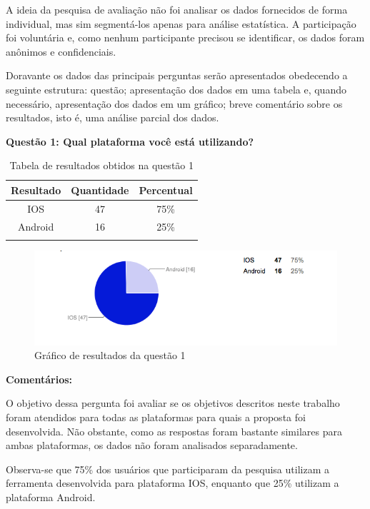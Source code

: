A ideia da pesquisa de avaliação não foi analisar os dados fornecidos de forma individual, mas sim segmentá-los apenas para análise estatística. A participação foi voluntária e, como nenhum participante precisou se identificar, os dados foram anônimos e confidenciais.    

Doravante os dados das principais perguntas serão apresentados obedecendo a seguinte estrutura: questão; apresentação dos dados em uma tabela e, quando necessário, apresentação dos dados em um gráfico; breve comentário sobre os resultados, isto é, uma análise parcial dos dados.

\textbf{Questão 1:  Qual plataforma você está utilizando?}

\begin{center}
\begin{longtable}{c|c|c}
\hline
    \multicolumn{1}{c}{\textbf{Resultado}} & \multicolumn{1}{c}{\textbf{Quantidade}} & \multicolumn{1}{c}{\textbf{Percentual}} \\
\hline
    IOS & 47 &  75\%\\
    \hline
    Android & 16 & 25\%\\
    \hline
\caption{Tabela de resultados obtidos na questão 1}
\end{longtable}
\end{center}


\begin{figure}[h]
\begin{center}
  \includegraphics[width=12cm]{images/graficos/questao1.png}
  \caption{Gráfico de resultados da questão 1}
  \label{fig:questao1}
\end{center}
\end{figure}

\textbf{Comentários:}

O objetivo dessa pergunta foi avaliar se os objetivos descritos neste trabalho foram atendidos para todas as plataformas para quais a proposta foi desenvolvida. Não obstante, como as respostas foram bastante similares para ambas plataformas, os dados não foram analisados separadamente. 

Observa-se que 75\% dos usuários que participaram da pesquisa utilizam a ferramenta desenvolvida para plataforma IOS, enquanto que 25\% utilizam a plataforma Android.\newline

